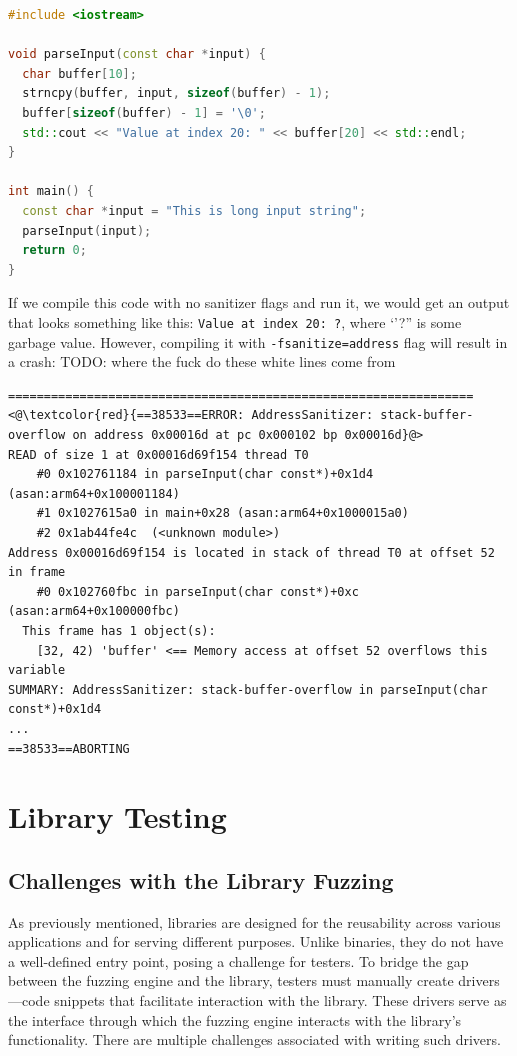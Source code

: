 \documentclass[a4paper,11pt,oneside]{report}
\begin{document}
\begin{lstlisting}[language={c++}]
#include <iostream>

void parseInput(const char *input) {
  char buffer[10];
  strncpy(buffer, input, sizeof(buffer) - 1);
  buffer[sizeof(buffer) - 1] = '\0';
  std::cout << "Value at index 20: " << buffer[20] << std::endl;
}

int main() {
  const char *input = "This is long input string";
  parseInput(input);
  return 0;
}
\end{lstlisting}

If we compile this code with no sanitizer flags and run it, we would get 
an output that looks something like this: \lstinline{Value at index 20: ?}, where `'?'' is some
garbage value. However, compiling it with \lstinline{-fsanitize=address} flag will
result in a crash: TODO: where the fuck do these white lines come from

\begin{lstlisting}[style=DOS]
=================================================================
<@\textcolor{red}{==38533==ERROR: AddressSanitizer: stack-buffer-overflow on address 0x00016d at pc 0x000102 bp 0x00016d}@>
READ of size 1 at 0x00016d69f154 thread T0
    #0 0x102761184 in parseInput(char const*)+0x1d4 (asan:arm64+0x100001184)
    #1 0x1027615a0 in main+0x28 (asan:arm64+0x1000015a0)
    #2 0x1ab44fe4c  (<unknown module>)
Address 0x00016d69f154 is located in stack of thread T0 at offset 52 in frame
    #0 0x102760fbc in parseInput(char const*)+0xc (asan:arm64+0x100000fbc)
  This frame has 1 object(s):
    [32, 42) 'buffer' <== Memory access at offset 52 overflows this variable
SUMMARY: AddressSanitizer: stack-buffer-overflow in parseInput(char const*)+0x1d4
...
==38533==ABORTING
\end{lstlisting}





\section{Library Testing}

\subsection{Challenges with the Library Fuzzing}

As previously mentioned, libraries are designed for the reusability 
across various applications and for serving different purposes. 
Unlike binaries, they do not have a well-defined entry point, 
posing a challenge for testers. To bridge the gap between the fuzzing 
engine and the library, testers must manually create drivers—code 
snippets that facilitate interaction with the library. These drivers 
serve as the interface through which the fuzzing engine interacts 
with the library's functionality. There are multiple challenges
associated with writing such drivers.
\end{document}
